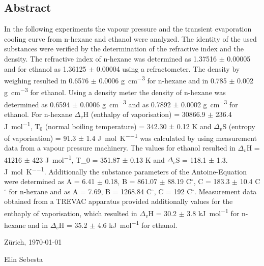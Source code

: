 \documentclass[a4paper,abstracton]{article}	                       %
\newcommand*\wildcard[2][5cm]{\vspace*{0cm}\parbox{#1}{\hrulefill\par#2}} %
\begin{document}
\begin{titlepage}
 \subsection*{Abstract}
In the following experiments the vapour pressure and the transient evaporation cooling curve from n-hexane and ethanol were analyzed. The identity of the used substances were verified by the determination of the refractive index and the density. The refractive index of n-hexane was determined as 1.37516 $\pm$ 0.00005 and for ethanol as 1.36125 $\pm$ 0.00004 using a refractometer. The density by weighing resulted in 0.6576 $\pm$ 0.0006 \si{\gram\per\cubic\centi\metre} for n-hexane and in 0.785 $\pm$ 0.002 \si{\gram\per\cubic\centi\metre} for ethanol. Using a density meter the density of n-hexane was determined as 0.6594 $\pm$ 0.0006 \si{\gram\per\cubic\centi\metre} and as 0.7892 $\pm$ 0.0002 \si{\gram\per\cubic\centi\metre} for ethanol. For n-hexane $\Delta_{\textit{v}}$H (enthalpy of vaporisation) = 30866.9 $\pm$ 236.4 \si{\joule\per\mol}, T$_{0}$ (normal boiling temperature) = 342.30 $\pm$ 0.12 K and $\Delta_{\textit{v}}$S (entropy of vaporisation) = 91.3 $\pm$ 1.4 \si{\joule\per\mol\per\kelvin} was calculated by using measurement data from a vapour pressure machinery. The values for ethanol resulted in  $\Delta_{\textit{v}}$H = 41216 $\pm$ 423 \si{\joule\per\mol}, T_{0} = 351.87 $\pm$ 0.13 K and $\Delta_{\textit{v}}$S = 118.1 $\pm$ 1.3.  \si{\joule\per\mol\per\kelvin}. Additionally the substance parameters of the Antoine-Equation were determined as A = 6.41 $\pm$ 0.18, B = 861.07 $\pm$ 88.19 C$^{\circ}$, C =  183.3 $\pm$ 10.4 C$^{\circ}$ for n-hexane and as  A = 7.69, B = 1268.84 C$^{\circ}$, C = 192 C$^{\circ}$. Measurement data 
obtained from a TREVAC apparatus provided additionally values for the enthaply of vaporisation, which resulted in $\Delta_{\textit{v}}$H = 30.2 $\pm$ 3.8 \si{\kilo\joule\per\mol} for n-hexane and in $\Delta_{\textit{v}}$H = 35.2 $\pm$ 4.6 \si{\kilo\joule\per\mol} for ethanol.

\vfill
	
	
Z\"urich,  \today
\hspace{\fill}
\begingroup
  \wildcard{Elin Sebesta}
\endgroup


\end{titlepage}



\pagestyle{fancy} \renewcommand{\headrulewidth}{0.5pt}
\end{document}

